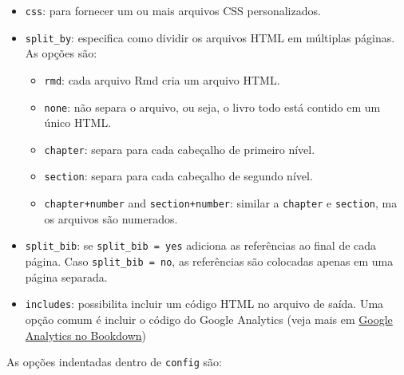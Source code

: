 \documentclass[
]{book}
\providecommand{\tightlist}{%
  \setlength{\itemsep}{0pt}\setlength{\parskip}{0pt}}
\begin{document}
\begin{itemize}
\tightlist
\item
  \texttt{css}: para fornecer um ou mais arquivos CSS personalizados.
\item
  \texttt{split\_by}: especifica como dividir os arquivos HTML em múltiplas páginas. As opções são:

  \begin{itemize}
  \tightlist
  \item
    \texttt{rmd}: cada arquivo Rmd cria um arquivo HTML.
  \item
    \texttt{none}: não separa o arquivo, ou seja, o livro todo está contido em um único HTML.
  \item
    \texttt{chapter}: separa para cada cabeçalho de primeiro nível.
  \item
    \texttt{section}: separa para cada cabeçalho de segundo nível.
  \item
    \texttt{chapter+number} and \texttt{section+number}: similar a \texttt{chapter} e \texttt{section}, ma os arquivos são numerados.
  \end{itemize}
\item
  \texttt{split\_bib}: se \texttt{split\_bib\ =\ yes} adiciona as referências ao final de cada página. Caso \texttt{split\_bib\ =\ no}, as referências são colocadas apenas em uma página separada.
\item
  \texttt{includes}: possibilita incluir um código HTML no arquivo de saída. Uma opção comum é incluir o código do Google Analytics (veja mais em \href{http://tolentino.pro.br/post/google-analytics/}{Google Analytics no Bookdown})
\end{itemize}

As opções indentadas dentro de \texttt{config} são:
\end{document}
